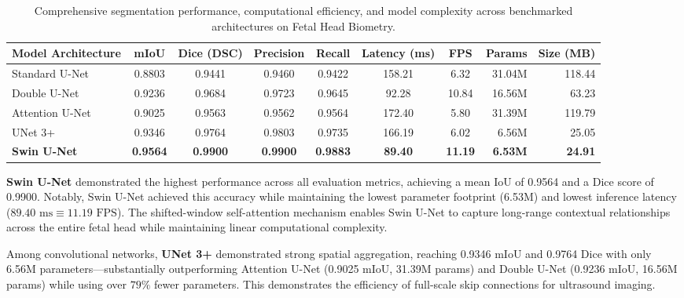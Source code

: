 \documentclass[conference]{IEEEtran}
\begin{document}
\begin{table}[t]
\caption{Comprehensive segmentation performance, computational efficiency, and model complexity across benchmarked architectures on Fetal Head Biometry.}
\label{tab:overall}
\centering
\small
\begin{tabular*}{\textwidth}{@{\extracolsep{\fill}}lccccccrr@{}}
\toprule
\textbf{Model Architecture} & \textbf{mIoU} & \textbf{Dice (DSC)} & \textbf{Precision} & \textbf{Recall} & \textbf{Latency (ms)} & \textbf{FPS} & \textbf{Params} & \textbf{Size (MB)} \\
\midrule
Standard U-Net~\cite{ronneberger2015u}     & 0.8803 & 0.9441 & 0.9460 & 0.9422 & 158.21 & 6.32  & 31.04M & 118.44 \\
Double U-Net~\cite{jha2020doubleu}         & 0.9236 & 0.9684 & 0.9723 & 0.9645 & 92.28  & 10.84 & 16.56M & 63.23  \\
Attention U-Net~\cite{oktay2018attention}  & 0.9025 & 0.9563 & 0.9562 & 0.9564 & 172.40 & 5.80  & 31.39M & 119.79 \\
UNet 3+~\cite{huang2020unet3plus}          & 0.9346 & 0.9764 & 0.9803 & 0.9735 & 166.19 & 6.02  & 6.56M  & 25.05  \\
\textbf{Swin U-Net}~\cite{cao2022swin}     & \textbf{0.9564} & \textbf{0.9900} & \textbf{0.9900} & \textbf{0.9883} & \textbf{89.40} & \textbf{11.19} & \textbf{6.53M} & \textbf{24.91} \\
\bottomrule
\end{tabular*}
\end{table}

\textbf{Swin U-Net} demonstrated the highest performance across all evaluation metrics, achieving a mean IoU of 0.9564 and a Dice score of 0.9900. Notably, Swin U-Net achieved this accuracy while maintaining the lowest parameter footprint (6.53M) and lowest inference latency ($89.40\text{ ms} \equiv 11.19\text{ FPS}$). The shifted-window self-attention mechanism enables Swin U-Net to capture long-range contextual relationships across the entire fetal head while maintaining linear computational complexity.

Among convolutional networks, \textbf{UNet 3+} demonstrated strong spatial aggregation, reaching 0.9346 mIoU and 0.9764 Dice with only 6.56M parameters---substantially outperforming Attention U-Net (0.9025 mIoU, 31.39M params) and Double U-Net (0.9236 mIoU, 16.56M params) while using over $79\%$ fewer parameters. This demonstrates the efficiency of full-scale skip connections for ultrasound imaging.
\end{document}
